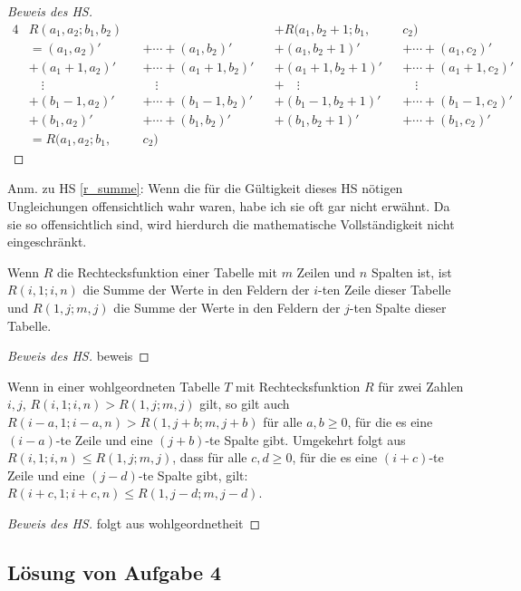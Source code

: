 \begin{proof}[Beweis des HS]
\begin{alignat*}{4}
        &R(a_1, a_2; b_1, b_2)&& &&+R(a_1, b_2+1; b_1, &&c_2)\\
        &=(a_1, a_2)' &&+\cdots+ (a_1, b_2)'
        &&+(a_1, b_2+1)'&&+\cdots+(a_1, c_2)'\\
        &+(a_1+1, a_2)'&&+\cdots+ (a_1+1, b_2)'
        &&+(a_1+1, b_2+1)'&&+\cdots+(a_1+1, c_2)'\\
        & \quad\vdots&&\quad\vdots&&+\quad\vdots&&\quad\vdots\\
        &+(b_1-1, a_2)'&&+\cdots + (b_1-1, b_2)'
        &&+(b_1-1, b_2+1)'&&+\cdots+(b_1-1, c_2)'\\
        &+(b_1, a_2)'&&+ \cdots + (b_1, b_2)'
        &&+(b_1, b_2+1)'&&+\cdots+(b_1, c_2)'\\
        &=R(a_1, a_2; b_1, &&c_2)
    \end{alignat*}
\end{proof}
Anm.  zu HS \ref{r_summe}: Wenn die für die Gültigkeit dieses HS nötigen Ungleichungen offensichtlich wahr waren, 
habe ich sie oft gar nicht erwähnt. Da sie so offensichtlich sind, wird hierdurch die mathematische Vollständigkeit 
nicht eingeschränkt.
\begin{lem}\label{r_zeile_spalte}
    Wenn $R$ die Rechtecksfunktion einer Tabelle mit $m$ Zeilen und $n$ Spalten ist, ist $R(i, 1; i, n)$ die Summe 
    der Werte in den Feldern der $i$-ten Zeile dieser Tabelle und $R(1, j; m, j)$ die Summe der Werte in den Feldern 
    der $j$-ten Spalte dieser Tabelle.
\end{lem}
\begin{proof}[Beweis des HS]
    beweis
\end{proof}
\begin{lem}\label{mehr_nuller}
    Wenn in einer wohlgeordneten Tabelle $T$ mit Rechtecksfunktion $R$ für zwei Zahlen $i, j$, $R(i, 1; i, n)>
    R(1, j; m, j)$ gilt, so gilt auch $R(i-a, 1; i-a, n)>R(1, j+b; m, j+b)$ für alle $a, b\geq0$, für die es eine 
    $(i-a)$-te Zeile und eine $(j+b)$-te Spalte gibt. Umgekehrt folgt aus $R(i, 1; i, n)\leq R(1, j; m, j)$, dass für 
    alle $c,d\geq0$, für die es eine $(i+c)$-te Zeile und  eine $(j-d)$-te Spalte gibt, gilt: $R(i+c, 1; i+c, n)\leq 
    R(1, j-d; m, j-d)$. 
\end{lem}
\begin{proof}[Beweis des HS]
    folgt aus wohlgeordnetheit %
\end{proof}

\subsection*{Lösung von Aufgabe 4}

